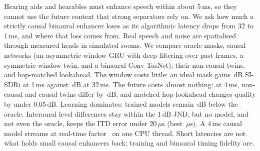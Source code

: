 Hearing aids and hearables must enhance speech within about 5\,ms, so
they cannot use the future context that strong separators rely on. We ask
how much a strictly causal binaural enhancer loses as its algorithmic
latency drops from 32 to 1\,ms, and where that loss comes from. Real speech
and noise are spatialised through measured heads in simulated rooms. We
compare oracle masks, causal networks (an asymmetric-window GRU with deep
filtering over past frames, a symmetric-window twin, and a binaural
Conv-TasNet), their non-causal twins, and hop-matched lookahead. The window
costs little: an ideal mask gains \OracleEarAsymOnems\,dB SI-SDRi at 1\,ms
against \OracleEarAsymThreeTwoms\,dB at 32\,ms. The future costs almost
nothing: at 4\,ms, non-causal and causal twins differ by
\LongGapFutureFourms\,dB, and matched-hop lookahead changes quality by
under 0.05\,dB. Learning dominates: trained models remain
\LongGapLearningFourms\,dB below the oracle. Interaural level differences
stay within the 1\,dB JND, but no model, and not even the oracle, keeps the
ITD error under 20\,$\mu$s (best \stftasymFourmsearlongItd\,$\mu$s). A 4\,ms
causal model streams at real-time factor \RtfstftasymFourms\ on one CPU
thread. Short latencies are not what holds small causal enhancers back;
training and binaural timing fidelity are.
